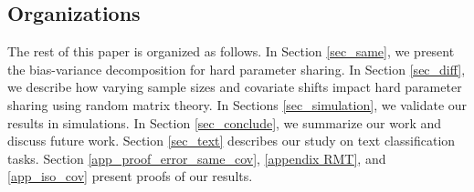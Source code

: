 \subsection{Organizations}
The rest of this paper is organized as follows.
In Section \ref{sec_same}, we present the bias-variance decomposition for hard parameter sharing.
In Section \ref{sec_diff}, we describe how varying sample sizes and covariate shifts impact hard parameter sharing using random matrix theory.
In Sections \ref{sec_simulation}, we validate our results in simulations.
In Section \ref{sec_conclude}, we summarize our work and discuss future work.
Section \ref{sec_text} describes our study on text classification tasks.
Section \ref{app_proof_error_same_cov}, \ref{appendix RMT}, and \ref{app_iso_cov} present proofs of our results.
